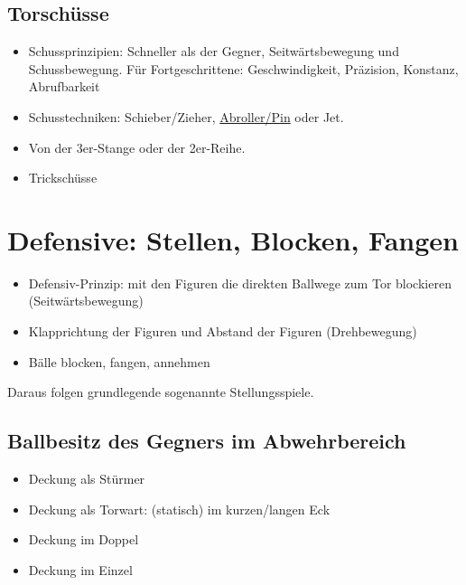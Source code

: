 \subsection{Torschüsse}
\label{technik:offensive:torschuesse}

\begin{itemize}
\item Schussprinzipien: Schneller als der Gegner, Seitwärtsbewegung und Schussbewegung. Für Fortgeschrittene: Geschwindigkeit, Präzision, Konstanz, Abrufbarkeit
\item Schusstechniken: Schieber/Zieher, \href{http://ungeblogtkickern.blogspot.de/2014/07/schritt-fur-schritt-pin-schieen.html}{Abroller/Pin} oder Jet.
\item Von der 3er-Stange oder der 2er-Reihe.
\item Trickschüsse
\end{itemize}





\section{Defensive: Stellen, Blocken, Fangen}
\label{technik:defensive}

\begin{itemize}
\item Defensiv-Prinzip: mit den Figuren die direkten Ballwege zum Tor blockieren (Seitwärtsbewegung)  
\item Klapprichtung der Figuren und Abstand der Figuren (Drehbewegung)
\item Bälle blocken, fangen, annehmen 
\end{itemize}
Daraus folgen grundlegende sogenannte Stellungsspiele.


\subsection{Ballbesitz des Gegners im Abwehrbereich}
\label{technik:defensive:gegnerabwehr}

\begin{itemize}
\item Deckung als Stürmer
\item Deckung als Torwart: (statisch) im kurzen/langen Eck
\item Deckung im Doppel
\item Deckung im Einzel
\end{itemize}


